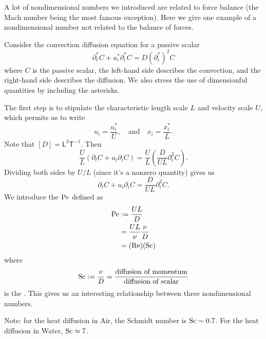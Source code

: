 \begin{node}\label{node:lec13:schmidt-number}
A lot of nondimensional numbers we introduced are related to force
balance (the Mach number being the most famous exception). Here we
give one example of a nondimensional number not related to the balance
of forces.

Consider the convection diffusion equation for a passive scalar
\begin{equation}
\partial_{t}^{*}C+u_{i}^{*}\partial_{i}^{*}C=D(\partial_{i}^{*})^{2}C
\end{equation}
where $C$ is the passive scalar, the left-hand side describes the
convection, and the right-hand side describes the diffusion. We also
stress the use of dimensionful quantities by including the asterisks.

The first step is to stipulate the characteristic length scale $L$ and
velocity scale $U$, which permits us to write
\begin{equation}
u_{i}=\frac{u_{i}^{*}}{U},\quad\mbox{and}\quad x_{i}=\frac{x_{i}^{*}}{L}.
\end{equation}
Note that $[D]=\mathsf{L}^{2}\mathsf{T}^{-1}$. Then
\begin{equation}
\frac{U}{L}(\partial_{t}C+u_{i}\partial_{i}C)=\frac{U}{L}\left(\frac{D}{UL}\partial_{i}^{2}C\right).
\end{equation}
Dividing both sides by $U/L$ (since it's a nonzero quantity) gives us
\begin{equation}
\partial_{t}C+u_{i}\partial_{i}C = \frac{D}{UL}\partial_{i}^{2}C.
\end{equation}
We introduce the  $\mathrm{Pe}$ defined as
\begin{subequations}
  \begin{align}
\mathrm{Pe} & := \frac{UL}{D}\\
&= \frac{UL}{\nu}\frac{\nu}{D}\\
&= (\mathrm{Re})(\mathrm{Sc})
  \end{align}
\end{subequations}
where
\begin{equation}
\mathrm{Sc} := \frac{\nu}{D} = \frac{\mbox{diffusion of momentum}}{\mbox{diffusion of scalar}}
\end{equation}
is the . This gives us an interesting
relationship between three nondimensional numbers.


Note: for the heat diffusion in Air, the Schmidt number is $\mathrm{Sc}\sim0.7$.
For the heat diffusion in Water, $\mathrm{Sc}\approx7$.
\end{node}

